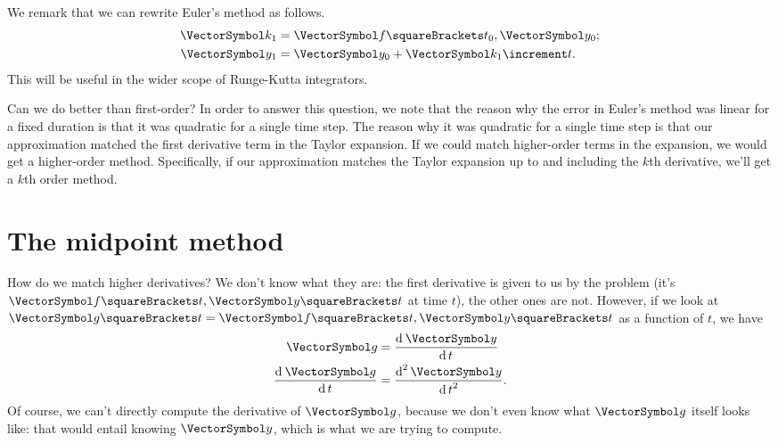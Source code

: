 \documentclass[10pt, a4paper, twoside]{basestyle}
\begin{document}
We remark that we can rewrite Euler's method as follows.
\begin{align*}
\vk_1 &= \vf\of{t_0, \vy_0}\text;\\
\vy_1 &= \vy_0 + \vk_1 \increment t\text.
\end{align*}
This will be useful in the wider scope of Runge-Kutta integrators.

Can we do better than first-order? In order to answer this question, we note that the reason why the error in Euler's method was linear for a fixed duration is that it was quadratic for a single time step. The reason why it was quadratic for a single time step is that our approximation matched the first derivative term in the Taylor expansion. If we could match higher-order terms in the expansion, we would get a higher-order method. Specifically, if our approximation matches the Taylor expansion up to and including the $k$th derivative, we'll get a $k$th order method.

\section{The midpoint method}
How do we match higher derivatives? We don't know what they are: the first derivative is given to us by the problem (it's $\vf\of{t, \vy\of t}$ at time $t$), the other ones are not. 
However, if we look at $\vg\of t = \vf\of{t, \vy\of t}$ as a function of $t$,
we have 
\begin{align*}
\vg &= \deriv t \vy \\
\deriv t \vg &= \deriv[2] t \vy\text.
\end{align*}
Of course, we can't directly compute the derivative of $\vg$, because we don't even know what $\vg$ itself looks like: that would entail knowing $\vy$, which is what we are trying to compute.
\end{document}
